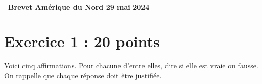 \documentclass[11pt]{article}
\begin{document}
\newpage
~
\newpage



\hypertarget{AmeriqueduNord}{}
\label{AmeriqueduNord}

\pagestyle{fancy}
\thispagestyle{empty}
\begin{center} {\huge \textbf{\decofourleft~Brevet Amérique du Nord 29 mai 2024 \decofourright}}
\end{center}

\bigskip

\section*{Exercice 1 : \hfill 20 points}
Voici cinq affirmations. Pour chacune d'entre elles, dire si elle est vraie ou fausse. On rappelle que chaque réponse doit être justifiée.
\end{document}
